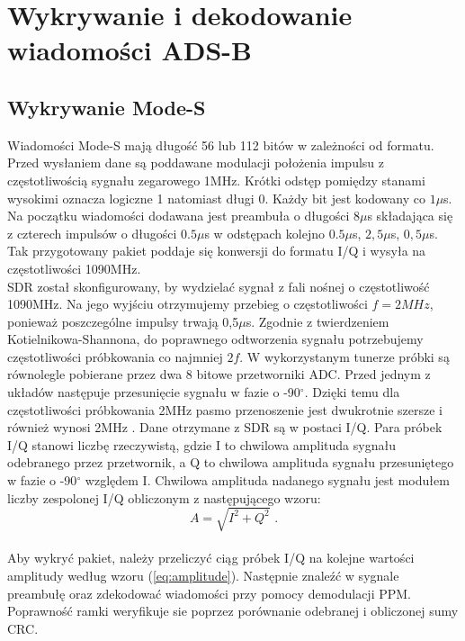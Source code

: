 \documentclass[eng,printmode]{mgr}
\begin{document}
\section{Wykrywanie i dekodowanie wiadomości ADS-B}
\subsection*{Wykrywanie Mode-S}
Wiadomości Mode-S mają długość 56 lub 112 bitów w zależności od formatu. Przed wysłaniem dane są poddawane modulacji położenia impulsu z częstotliwością sygnału zegarowego 1MHz. Krótki odstęp pomiędzy stanami wysokimi oznacza logiczne 1 natomiast długi 0. 
Każdy bit jest kodowany co $1\mu$s. Na początku wiadomości dodawana jest preambuła o długości $8\mu$s składająca się z czterech impulsów o długości $0.5\mu$s w odstępach kolejno $0.5\mu$s, $2,5\mu$s, $0,5\mu$s. Tak przygotowany pakiet poddaje się konwersji do formatu I/Q i wysyła na częstotliwości 1090MHz.
\\


SDR został skonfigurowany, by wydzielać sygnał z fali nośnej o częstotliwość 1090MHz.
Na jego wyjściu otrzymujemy przebieg o częstotliwości $f=2MHz$, ponieważ poszczególne impulsy trwają 0,5$\mu$s. Zgodnie z twierdzeniem Kotielnikowa-Shannona, do poprawnego odtworzenia sygnału potrzebujemy częstotliwości próbkowania co najmniej $2f$. W wykorzystanym tunerze próbki są równolegle pobierane przez dwa 8 bitowe przetworniki ADC. Przed jednym z układów następuje przesunięcie sygnału w fazie o -90$^\circ$. Dzięki temu dla częstotliwości próbkowania 2MHz pasmo przenoszenie jest dwukrotnie szersze i również wynosi 2MHz \cite{digit}. Dane otrzymane z SDR są w postaci I/Q. Para próbek I/Q stanowi liczbę rzeczywistą, gdzie I to chwilowa amplituda sygnału odebranego przez przetwornik, a Q to chwilowa amplituda sygnału przesuniętego w fazie o -90$^\circ$ względem I. Chwilowa amplituda nadanego sygnału jest modułem liczby zespolonej I/Q obliczonym z następującego wzoru:
\\
\begin{equation}
\label{eq:amplitude}
A = \sqrt{I^2 + Q^2}\textrm{ .}
\end{equation}
\\
Aby wykryć pakiet, należy przeliczyć ciąg próbek I/Q na kolejne wartości amplitudy według wzoru (\ref{eq:amplitude}). Następnie znaleźć w sygnale preambułę oraz zdekodować wiadomości przy pomocy demodulacji PPM. Poprawność ramki weryfikuje sie poprzez porównanie odebranej i obliczonej sumy CRC.
\\
\end{document}
